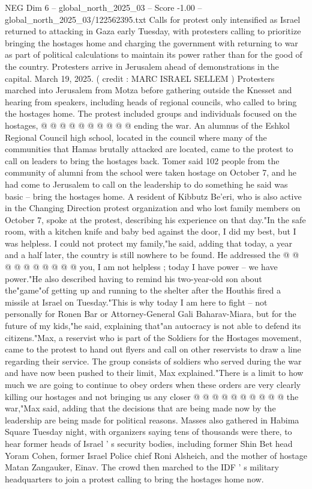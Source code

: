 \begin{textsample}{NEG Dim 6 – global\_north\_2025\_03 – Score -1.00 – global\_north\_2025\_03/122562395.txt}
Calls for protest only intensified as Israel returned to attacking in Gaza early Tuesday, with protesters calling to prioritize bringing the hostages home and charging the government with returning to war as part of political calculations to maintain its power rather than for the good of the country.
Protesters arrive in Jerusalem ahead of demonstrations in the capital.
March 19, 2025. ( credit : MARC ISRAEL SELLEM ) Protesters marched into Jerusalem from Motza before gathering outside the Knesset and hearing from speakers, including heads of regional councils, who called to bring the hostages home.
The protest included groups and individuals focused on the hostages, @ @ @ @ @ @ @ @ @ @ ending the war.
An alumnus of the Eshkol Regional Council high school, located in the council where many of the communities that Hamas brutally attacked are located, came to the protest to call on leaders to bring the hostages back.
Tomer said 102 people from the community of alumni from the school were taken hostage on October 7, and he had come to Jerusalem to call on the leadership to do something he said was basic -- bring the hostages home.
A resident of Kibbutz Be'eri, who is also active in the Changing Direction protest organization and who lost family members on October 7, spoke at the protest, describing his experience on that day."In the safe room, with a kitchen knife and baby bed against the door, I did my best, but I was helpless.
I could not protect my family,"he said, adding that today, a year and a half later, the country is still nowhere to be found.
He addressed the @ @ @ @ @ @ @ @ @ @ you, I am not helpless ; today I have power -- we have power."He also described having to remind his two-year-old son about the"game"of getting up and running to the shelter after the Houthis fired a missile at Israel on Tuesday."This is why today I am here to fight -- not personally for Ronen Bar or Attorney-General Gali Baharav-Miara, but for the future of my kids,"he said, explaining that"an autocracy is not able to defend its citizens."Max, a reservist who is part of the Soldiers for the Hostages movement, came to the protest to hand out flyers and call on other reservists to draw a line regarding their service.
The group consists of soldiers who served during the war and have now been pushed to their limit, Max explained."There is a limit to how much we are going to continue to obey orders when these orders are very clearly killing our hostages and not bringing us any closer @ @ @ @ @ @ @ @ @ @ the war,"Max said, adding that the decisions that are being made now by the leadership are being made for political reasons.
Masses also gathered in Habima Square Tuesday night, with organizers saying tens of thousands were there, to hear former heads of Israel ' s security bodies, including former Shin Bet head Yoram Cohen, former Israel Police chief Roni Alsheich, and the mother of hostage Matan Zangauker, Einav.
The crowd then marched to the IDF ' s military headquarters to join a protest calling to bring the hostages home now.

\end{textsample}

